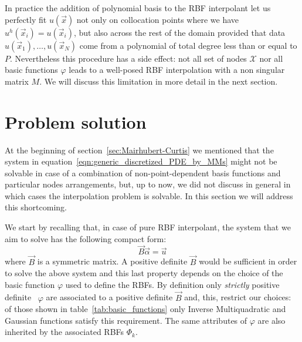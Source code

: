 In practice the addition of polynomial basis to the RBF interpolant let us perfectly fit $u(\vec{x})$ not only on collocation points where we have $u^h(\vec{x}_i)  = u(\vec{x}_i)$, but also across the rest of the domain provided that data $u(\vec{x}_1), \dots, u(\vec{x}_N)$ come from a polynomial of total degree less than or equal to $P$.  Nevertheless this procedure has a side effect: not all set of nodes $\mathcal{X}$ nor all basic functions $\varphi$ leads to a well-posed RBF interpolation with a non singular matrix $M$. We will discuss this limitation in more detail in the next section.



\section{Problem solution}
\label{sec:interpolation_prob_solution}

At the beginning of section~\ref{sec:Mairhubert-Curtis} we mentioned that the system in equation~\eqref{eqn:generic_discretized_PDE_by_MMs} might not be solvable in case of a combination of non-point-dependent basis functions and particular nodes arrangements, but, up to now, we did not discuss in general in which cases the interpolation problem is solvable. In this section we will address this shortcoming.

We start by recalling that, in case of pure RBF interpolant, the system that we aim to solve has the following compact form:
\begin{equation}
	\label{eqn:general_system_from_scattred_data_interpolation_compact_form}
	\vec{B} \vec{\alpha} = \vec{u}
\end{equation}
where $\vec{B}$ is a symmetric matrix.
A positive definite $\vec{B}$ would be sufficient in order to solve the above system and this last property depends on the choice of the basic function $\varphi$ used to define the RBFs. By definition only \emph{strictly} positive definite~\cite{Fasshauer:details_on_basic_functions} $\varphi$ are associated to a positive definite $\vec{B}$ and, this, restrict our choices: of those shown in table~\ref{tab:basic_functions} only Inverse Multiquadratic and Gaussian functions satisfy this requirement. The same attributes of $\varphi$ are also inherited by the associated RBFs $\Phi_k$.

